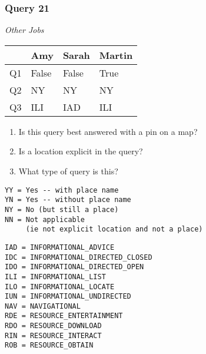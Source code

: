 \begin{frame}[fragile]
\frametitle{Query 21}
\vspace{1em}

\emph{Other Jobs}

\vfill

\begin{table}
  \centering
  \begin{tabular}{ l l l l }
    & \textbf{Amy} & \textbf{Sarah} & \textbf{Martin}\\
    \toprule
    Q1 & False & False & True\\
Q2 & NY & NY & NY\\
Q3 & ILI & IAD & ILI\\
    \bottomrule
  \end{tabular}
\end{table}

\vfill

\tiny{

\begin{enumerate}
\item Is this query best answered with a pin on a map?
\item Is a location explicit in the query?
\item What type of query is this?
\end{enumerate}

\vfill

\begin{multicols}{2}
\begin{verbatim}
YY = Yes -- with place name
YN = Yes -- without place name
NY = No (but still a place)
NN = Not applicable 
     (ie not explicit location and not a place)
\end{verbatim}

\columnbreak
\begin{verbatim}
IAD = INFORMATIONAL_ADVICE
IDC = INFORMATIONAL_DIRECTED_CLOSED
IDO = INFORMATIONAL_DIRECTED_OPEN
ILI = INFORMATIONAL_LIST
ILO = INFORMATIONAL_LOCATE
IUN = INFORMATIONAL_UNDIRECTED
NAV = NAVIGATIONAL
RDE = RESOURCE_ENTERTAINMENT
RDO = RESOURCE_DOWNLOAD
RIN = RESOURCE_INTERACT
ROB = RESOURCE_OBTAIN
\end{verbatim}
\end{multicols}
}

\end{frame}



